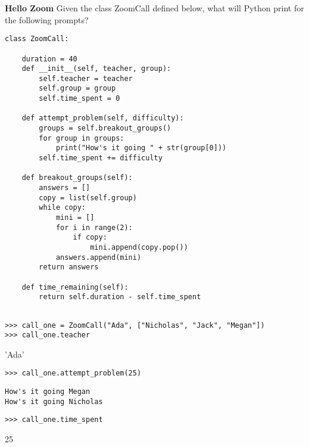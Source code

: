 \begin{blocksection}
\question \textbf{Hello Zoom} \newline
Given the class ZoomCall defined below, what will Python print for the following prompts? 

\begin{lstlisting}
class ZoomCall:

    duration = 40
    def __init__(self, teacher, group):
        self.teacher = teacher
        self.group = group
        self.time_spent = 0

    def attempt_problem(self, difficulty):
        groups = self.breakout_groups()
        for group in groups:
            print("How's it going " + str(group[0]))
        self.time_spent += difficulty

    def breakout_groups(self):
        answers = []
        copy = list(self.group)
        while copy:
            mini = []
            for i in range(2):
                if copy:
                    mini.append(copy.pop())
            answers.append(mini)
        return answers

    def time_remaining(self):
        return self.duration - self.time_spent
       
\end{lstlisting}
\end{blocksection}
\newline
\newline
\newline
\begin{blocksection}

\begin{lstlisting}
>>> call_one = ZoomCall("Ada", ["Nicholas", "Jack", "Megan"])
>>> call_one.teacher
\end{lstlisting}
\begin{solution}[.2in]
'Ada'
\end{solution}

\begin{lstlisting}
>>> call_one.attempt_problem(25)
\end{lstlisting}
\begin{solution}[.2in]
\begin{lstlisting}
How's it going Megan
How's it going Nicholas
\end{lstlisting}
\end{solution}

\begin{lstlisting}
>>> call_one.time_spent
\end{lstlisting}
\begin{solution}[.2in]
25
\end{solution}
\end{blocksection}

